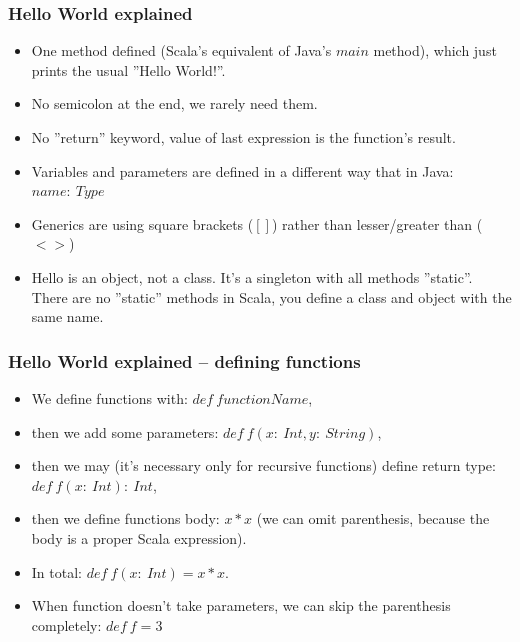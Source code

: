 \documentclass[xcolor=dvipsnames]{beamer}
\begin{document}

\begin{frame}
\frametitle{Hello World explained}
\begin{itemize}
\item One method defined (Scala's equivalent of Java's $main$ method), which just prints the usual ''Hello World!''.
\item No semicolon at the end, we rarely need them.
\item No ''return'' keyword, value of last expression is the function's result.
\item Variables and parameters are defined in a different way that in Java: $name:\:Type$
\item Generics are using square brackets ($[]$) rather than lesser/greater than ($<>$)
\item Hello is an object, not a class. It's a singleton with all methods ''static''. There are no ''static'' methods in Scala, you define a class and object with the same name.
\end{itemize}
\end{frame}

\begin{frame}
\frametitle{Hello World explained -- defining functions}
\begin{itemize}
\item We define functions with: $def\:functionName$,
\item then we add some parameters: $def\:f(x:\:Int, y:\:String)$,
\item then we may (it's necessary only for recursive functions) define return type: $def\:f(x:\:Int):\:Int$,
\item then we define functions body: $x * x$ (we can omit parenthesis, because the body is a proper Scala expression).
\item In total: $def\:f(x:\:Int) = x * x$.
\item When function doesn't take parameters, we can skip the parenthesis completely: $def\:f = 3$
\end{itemize}
\end{frame}
\end{document}
